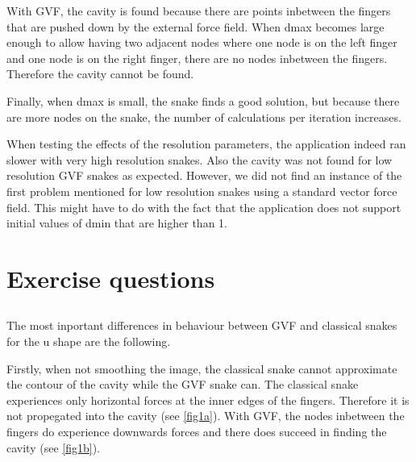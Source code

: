 \documentclass{article}
\begin{document}
With GVF, the cavity is found because there are points inbetween the fingers that are pushed down by the external force field. When dmax becomes large enough to allow having two adjacent nodes where one node is on the left finger and one node is on the right finger, there are no nodes inbetween the fingers. Therefore the cavity cannot be found.

Finally, when dmax is small, the snake finds a good solution, but because there are more nodes on the snake, the number of calculations per iteration increases.

When testing the effects of the resolution parameters, the application indeed ran slower with very high resolution snakes. Also the cavity was not found for low resolution GVF snakes as expected. However, we did not find an instance of the first problem mentioned for low resolution snakes using a standard vector force field. This might have to do with the fact that the application does not support initial values of dmin that are higher than 1.

\renewcommand{\thesubsection}{\large{Exercise \arabic{subsection}}}
\section{Exercise questions}
\subsection{}
The most inportant differences in behaviour between GVF and classical snakes for the u shape are the following. 

Firstly, when not smoothing the image, the classical snake cannot approximate the contour of the cavity while the GVF snake can. The classical snake experiences only horizontal forces at the inner edges of the fingers. Therefore it is not propegated into the cavity (see \ref{fig1a}). With GVF, the nodes inbetween the fingers do experience downwards forces and there does succeed in finding the cavity (see \ref{fig1b}).
\end{document}
